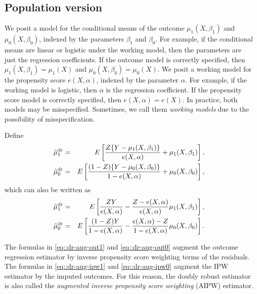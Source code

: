 \subsection{Population version}


We posit a model for the conditional means of the outcome $\mu_1(X, \beta_1)$ and $\mu_0(X, \beta_0)$, indexed by the parameters $\beta_1$ and $\beta_0$. For example, if the conditional means are linear or logistic under the working model, then the parameters are just the regression coefficients. If the outcome  model is  correctly specified, then $\mu_1(X, \beta_1) = \mu_1(X)$ and $   \mu_0(X, \beta_0) = \mu_0(X)$. 
We posit a working model for the propensity score $e(X, \alpha)$, indexed by the parameter $\alpha$. For example, if the working model is logistic, then $\alpha$ is the regression coefficient. If the propensity score model is correctly specified, then $e(X,\alpha) = e(X)$. In practice, both models may be misspecified. Sometimes, we call them {\it working models}  due to the possibility of misspecification. 

Define 
\begin{eqnarray}
\tilde{\mu}_1^\textup{dr} &=& E\left[   \frac{Z\{ Y-\mu_1(X,\beta_1) \}}{  e(X,\alpha) }   + \mu_1(X, \beta_1)  \right] , \label{eq::dr-aug-out1}   \\
\tilde{\mu}_0^\textup{dr} &=& E\left[   \frac{(1-Z)\{ Y-\mu_0(X,\beta_0) \}}{  1-e(X,\alpha) }   + \mu_0(X, \beta_0)  \right]  , \label{eq::dr-aug-out0} 
\end{eqnarray}
which can also be written as 
\begin{eqnarray}
\tilde{\mu}_1^\textup{dr} &=& E\left[   \frac{Z Y}{  e(X,\alpha) }   - \frac{  Z -  e(X,\alpha)  }{ e(X,\alpha) } \mu_1(X, \beta_1)  \right]  ,\label{eq::dr-aug-ipw1} \\
\tilde{\mu}_0^\textup{dr} &=& E\left[   \frac{(1-Z) Y}{  1-e(X,\alpha) }    - \frac{ e(X,\alpha)-Z  }{1- e(X,\alpha)} \mu_0(X, \beta_0)  \right]    .\label{eq::dr-aug-ipw0} 
\end{eqnarray}
 
The formulas in \eqref{eq::dr-aug-out1} and \eqref{eq::dr-aug-out0} augment the outcome regression estimator by inverse propensity score weighting terms of the residuals. The formulas in \eqref{eq::dr-aug-ipw1} and \eqref{eq::dr-aug-ipw0} augment the IPW estimator by the imputed outcomes. For this reason, the doubly robust estimator is also called the {\it augmented inverse propensity score weighting} (AIPW) estimator. 



